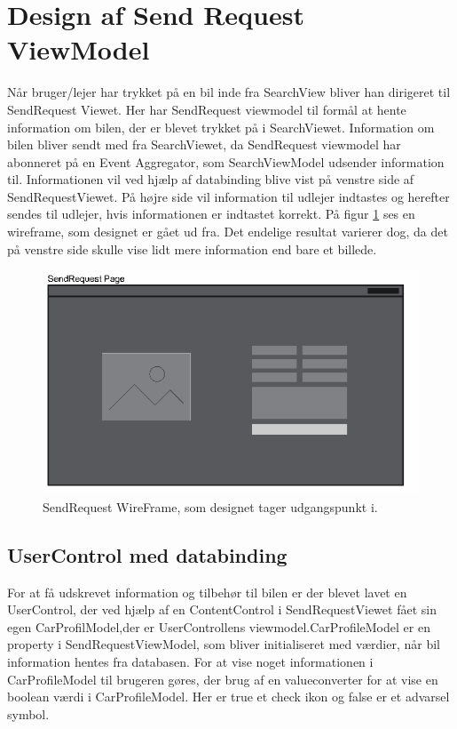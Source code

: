 \documentclass[SoftwareDesign/SoftwareDesign_main.tex]{subfiles}
\begin{document}
\section{Design af Send Request ViewModel}
Når bruger/lejer har trykket på en bil inde fra SearchView bliver han dirigeret til SendRequest Viewet. Her har SendRequest viewmodel til formål at hente information om bilen, der er blevet trykket på i SearchViewet. Information om bilen bliver sendt med fra SearchViewet, da SendRequest viewmodel har abonneret på en Event Aggregator, som SearchViewModel udsender information til. Informationen vil ved hjælp af databinding blive vist på venstre side af SendRequestViewet. På højre side vil information til udlejer indtastes og herefter sendes til udlejer, hvis informationen er indtastet korrekt. På figur \ref{fig:sendrequestwirefram} ses en wireframe, som designet er gået ud fra. Det endelige resultat varierer dog, da det på venstre side skulle vise lidt mere information end bare et billede.
\begin{figure}[H]
    \centering
    \includegraphics[width=\textwidth]{SoftwareDesign/MVVMDesigns/Graphics/SendRequestWireFrame.PNG}
    \caption{SendRequest WireFrame, som designet tager udgangspunkt i.}
    \label{fig:sendrequestwirefram}
\end{figure}

\subsection{UserControl med databinding}
For at få udskrevet information og tilbehør til bilen er der blevet lavet en UserControl, der ved hjælp af en ContentControl i SendRequestViewet fået sin egen CarProfilModel,der er UserControllens viewmodel.CarProfileModel er en property i SendRequestViewModel, som bliver initialiseret med værdier, når bil information hentes fra databasen. For at vise noget informationen i CarProfileModel til brugeren gøres, der brug af en valueconverter for at vise en boolean værdi i CarProfileModel. Her er true et check ikon og false er et advarsel symbol.
\end{document}
